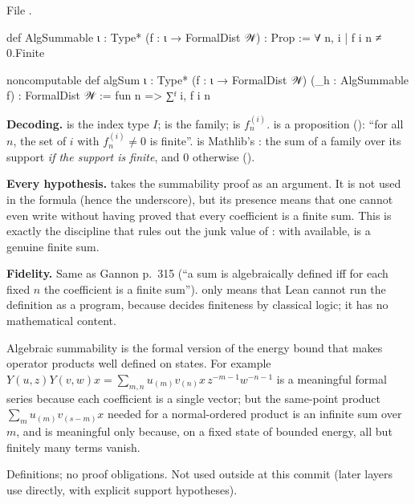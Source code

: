 \noindent File .
\begin{leancode}
def AlgSummable {ι : Type*} (f : ι → FormalDist 𝒲) : Prop := ∀ n, {i | f i n ≠ 0}.Finite

noncomputable def algSum {ι : Type*} (f : ι → FormalDist 𝒲) (_h : AlgSummable f) :
    FormalDist 𝒲 := fun n => ∑ᶠ i, f i n
\end{leancode}

\begin{dictionary}
\textbf{Decoding.}  is the index type $I$;  is the family;
 is $f^{(i)}_n$.  is a proposition (): ``for all $n$, the set of
$i$ with $f^{(i)}_n\neq0$ is finite''.  is Mathlib's : the sum of a
family over its support \emph{if the support is finite}, and $0$ otherwise
().

\textbf{Every hypothesis.}  takes the summability proof  as an argument. It is not
used in the formula (hence the underscore), but its presence means that one cannot even write
 without having proved that every coefficient is a finite sum. This is exactly the
discipline that rules out the junk value of : with  available,  is
a genuine finite sum.

\textbf{Fidelity.} Same as Gannon p.~315 (``a sum is algebraically defined iff for each fixed $n$ the
coefficient is a finite sum'').  only means that Lean cannot run the definition as a
program, because  decides finiteness by classical logic; it has no mathematical content.
\end{dictionary}

\begin{physics}
Algebraic summability is the formal version of the energy bound that makes operator products well
defined on states. For example $Y(u,z)Y(v,w)x = \sum_{m,n}u_{(m)}v_{(n)}x\,z^{-m-1}w^{-n-1}$
is a meaningful formal series because each coefficient is a single vector; but the same-point
product $\sum_m u_{(m)}v_{(s-m)}x$ needed for a normal-ordered product is an infinite sum over $m$,
and is meaningful only because, on a fixed state of bounded energy, all but finitely many terms vanish.
\end{physics}

\begin{status}
Definitions; no proof obligations. Not used outside  at this commit
(later layers use  directly, with explicit support hypotheses).
\end{status}

